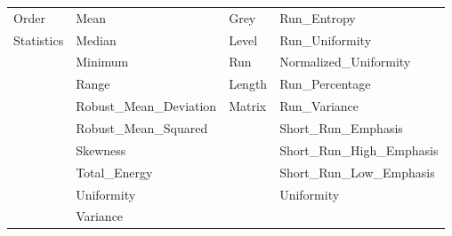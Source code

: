 \documentclass[final,1p,times,twocolumn]{elsarticle}
\begin{document}
\begin{table}[!b]
\begin{tabular}{| l | l | l | l |}
Order&Mean&Grey&Run\_Entropy\\
Statistics&Median& Level&Run\_Uniformity\\
&Minimum& Run &Normalized\_Uniformity\\
&Range&Length &Run\_Percentage\\
&Robust\_Mean\_Deviation&Matrix&Run\_Variance\\
&Robust\_Mean\_Squared&&Short\_Run\_Emphasis\\
&Skewness&&Short\_Run\_High\_Emphasis\\
&Total\_Energy&&Short\_Run\_Low\_Emphasis\\
&Uniformity&&Uniformity\\
&Variance&&\\
\hline
\end{tabular}
\end{table}
\end{document}
